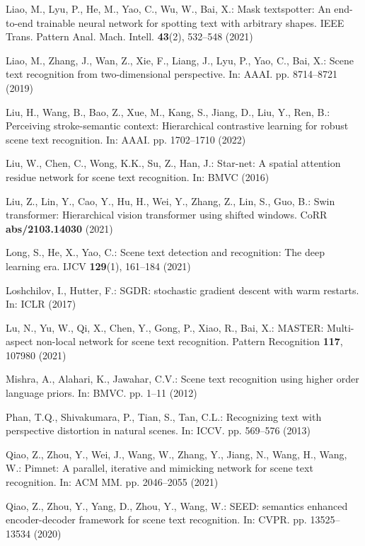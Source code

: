 \documentclass[runningheads]{llncs}
\begin{document}
\begin{thebibliography}{10}
Liao, M., Lyu, P., He, M., Yao, C., Wu, W., Bai, X.: Mask textspotter: An
  end-to-end trainable neural network for spotting text with arbitrary shapes.
  {IEEE} Trans. Pattern Anal. Mach. Intell.  \textbf{43}(2),  532--548 (2021)

Liao, M., Zhang, J., Wan, Z., Xie, F., Liang, J., Lyu, P., Yao, C., Bai, X.:
  Scene text recognition from two-dimensional perspective. In: AAAI. pp.
  8714--8721 (2019)

Liu, H., Wang, B., Bao, Z., Xue, M., Kang, S., Jiang, D., Liu, Y., Ren, B.:
  Perceiving stroke-semantic context: Hierarchical contrastive learning for
  robust scene text recognition. In: AAAI. pp. 1702--1710 (2022)

Liu, W., Chen, C., Wong, K.K., Su, Z., Han, J.: Star-net: {A} spatial attention
  residue network for scene text recognition. In: BMVC (2016)

Liu, Z., Lin, Y., Cao, Y., Hu, H., Wei, Y., Zhang, Z., Lin, S., Guo, B.: Swin
  transformer: Hierarchical vision transformer using shifted windows. CoRR
  \textbf{abs/2103.14030} (2021)

Long, S., He, X., Yao, C.: Scene text detection and recognition: The deep
  learning era. IJCV  \textbf{129}(1),  161--184 (2021)

Loshchilov, I., Hutter, F.: {SGDR:} stochastic gradient descent with warm
  restarts. In: ICLR (2017)

Lu, N., Yu, W., Qi, X., Chen, Y., Gong, P., Xiao, R., Bai, X.: {MASTER}:
  Multi-aspect non-local network for scene text recognition. Pattern
  Recognition  \textbf{117},  107980 (2021)

Mishra, A., Alahari, K., Jawahar, C.V.: Scene text recognition using higher
  order language priors. In: BMVC. pp. 1--11 (2012)

Phan, T.Q., Shivakumara, P., Tian, S., Tan, C.L.: Recognizing text with
  perspective distortion in natural scenes. In: ICCV. pp. 569--576 (2013)

Qiao, Z., Zhou, Y., Wei, J., Wang, W., Zhang, Y., Jiang, N., Wang, H., Wang,
  W.: Pimnet: {A} parallel, iterative and mimicking network for scene text
  recognition. In: ACM MM. pp. 2046--2055 (2021)

Qiao, Z., Zhou, Y., Yang, D., Zhou, Y., Wang, W.: {SEED:} semantics enhanced
  encoder-decoder framework for scene text recognition. In: CVPR. pp.
  13525--13534 (2020)


\end{thebibliography}
\end{document}

